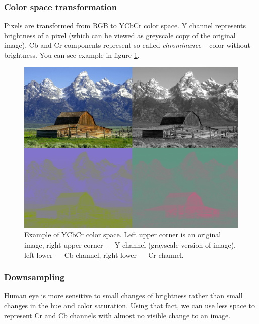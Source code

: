 \subsubsection{Color space transformation}

Pixels are transformed from RGB to YCbCr color space. Y channel represents
brightness of a pixel ({which can be viewed as greyscale copy of the original image}),
Cb and Cr components represent so called \textit{chrominance} -- color without brightness. 
You can see example in figure \ref{img:YCbCr}.


\begin{figure}
\centerline{\includegraphics[height=0.4\textheight]{images/Barns_grand_tetons_YCbCr_separation_quad.jpg}}
\caption[Example of YCbCr color space (Public domain)]{Example of YCbCr color space. 
Left upper corner is an original image,
right upper corner --- Y channel (grayscale version of image),
left lower --- Cb channel,
right lower --- Cr channel.}
\label{img:YCbCr}
\end{figure}

\subsubsection{Downsampling}

Human eye is more sensitive to small changes of brightness rather 
than small changes in the hue and color saturation. Using that fact, 
we can use less space to represent Cr and Cb channels with almost no visible change
to an image. 

